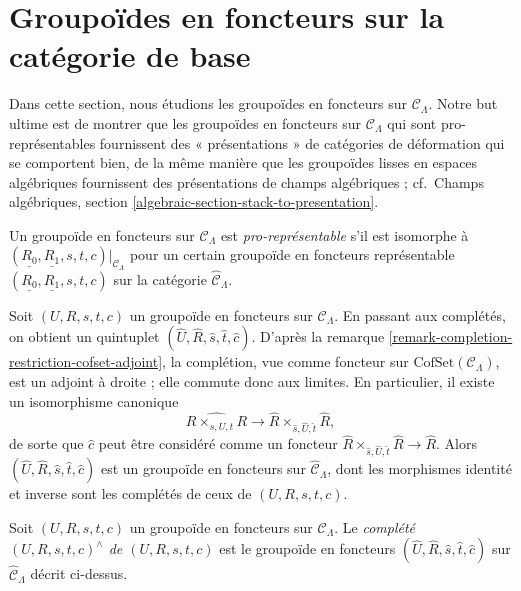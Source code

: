 \section{Groupoïdes en foncteurs sur la catégorie de base}
\label{section-prorepresentable-groupoids-in-functors}

\noindent
Dans cette section, nous étudions les groupoïdes en foncteurs sur
$\mathcal{C}_\Lambda$. Notre but ultime est de montrer que les groupoïdes en
foncteurs sur $\mathcal{C}_\Lambda$ qui sont pro-représentables fournissent des
« présentations » de catégories de déformation qui se comportent bien, de la
même manière que les groupoïdes lisses en espaces algébriques fournissent des
présentations de champs algébriques ; cf.\ Champs algébriques, section
\ref{algebraic-section-stack-to-presentation}.

\begin{definition}
\label{definition-prorepresentable-groupoid-in-functors}
Un groupoïde en foncteurs sur $\mathcal{C}_\Lambda$ est
{\it pro-représentable} s'il est isomorphe à
$(\underline{R_0}, \underline{R_1}, s, t, c)|_{\mathcal{C}_\Lambda}$
pour un certain groupoïde en foncteurs représentable
$(\underline{R_0}, \underline{R_1}, s, t, c)$ sur la catégorie
$\widehat{\mathcal{C}}_\Lambda$.
\end{definition}

\noindent
Soit $(U, R, s, t, c)$ un groupoïde en foncteurs sur
$\mathcal{C}_\Lambda$. En passant aux complétés, on obtient un quintuplet
$(\widehat{U}, \widehat{R}, \widehat{s}, \widehat{t}, \widehat{c})$. D'après
la remarque \ref{remark-completion-restriction-cofset-adjoint}, la complétion,
vue comme foncteur sur $\text{CofSet}(\mathcal{C}_\Lambda)$, est un adjoint à
droite ; elle commute donc aux limites. En particulier, il existe un
isomorphisme canonique
$$
\widehat{R \times_{s, U, t} R}
\longrightarrow
\widehat{R} \times_{\widehat{s}, \widehat{U}, \widehat{t}} \widehat{R},
$$
de sorte que $\widehat{c}$ peut être considéré comme un foncteur
$\widehat{R} \times_{\widehat{s}, \widehat{U}, \widehat{t}} \widehat{R} \to
\widehat{R}$. Alors
$(\widehat{U}, \widehat{R}, \widehat{s}, \widehat{t}, \widehat{c})$
est un groupoïde en foncteurs sur $\widehat{\mathcal{C}}_\Lambda$, dont les
morphismes identité et inverse sont les complétés de ceux de
$(U, R, s, t, c)$.

\begin{definition}
\label{definition-completion-groupoid-in-functors}
Soit $(U, R, s, t, c)$ un groupoïde en foncteurs sur
$\mathcal{C}_\Lambda$. Le {\it complété $(U, R, s, t, c)^{\wedge}$ de
$(U, R, s, t, c)$} est le groupoïde en foncteurs
$(\widehat{U}, \widehat{R}, \widehat{s}, \widehat{t}, \widehat{c})$ sur
$\widehat{\mathcal{C}}_\Lambda$ décrit ci-dessus.
\end{definition}

